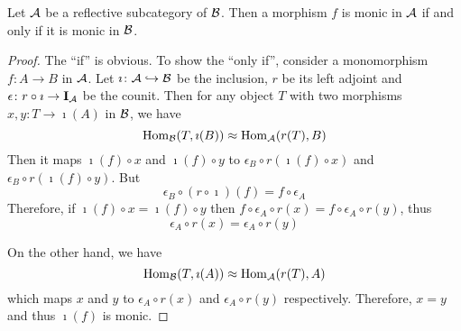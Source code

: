   \begin{prop}
    Let ${\cal A}$ be a reflective subcategory of ${\cal B}$. Then a morphism $f$ is monic in ${\cal A}$ if and only if it is monic in ${\cal B}$.
  \end{prop}
  \begin{proof}
    The ``if'' is obvious. To show the ``only if'', consider a monomorphism $f\colon A\to B$ in ${\cal A}$. Let $\imath\colon{\cal A}\hookrightarrow{\cal B}$ be the inclusion, $r$ be its left adjoint and $\epsilon\colon r\circ\imath\to\operatorname{\mathbf{I}}_{{\cal A}}$ be the counit.
    Then for any object $T$ with two morphisms $x,y\colon T\to\imath(A)$ in ${\cal B}$, we have
    \begin{equation*}
      \operatorname{Hom}_{{\cal B}}(T,\imath(B)) \approx \operatorname{Hom}_{{\cal A}}(r(T),B)
    \end{equation*}
    Then it maps $\imath(f)\circ x$ and $\imath(f)\circ y$ to $\epsilon_B\circ r(\imath(f)\circ x)$ and $\epsilon_B\circ r(\imath(f)\circ y)$. But
    \begin{equation*}
      \epsilon_B\circ (r\circ\imath)(f) = f\circ\epsilon_A
    \end{equation*}
    Therefore, if $\imath(f)\circ x = \imath(f)\circ y$ then $f\circ\epsilon_A \circ r(x)=  f\circ\epsilon_A\circ r(y)$, thus
    \begin{equation*}
      \epsilon_A \circ r(x)= \epsilon_A\circ r(y)
    \end{equation*}

    On the other hand, we have
    \begin{equation*}
      \operatorname{Hom}_{{\cal B}}(T,\imath(A)) \approx \operatorname{Hom}_{{\cal A}}(r(T),A)
    \end{equation*}
    which maps $x$ and $y$ to $\epsilon_A\circ r(x)$ and $\epsilon_A\circ r(y)$ respectively.
    Therefore, $x=y$ and thus $\imath(f)$ is monic.
  \end{proof}


